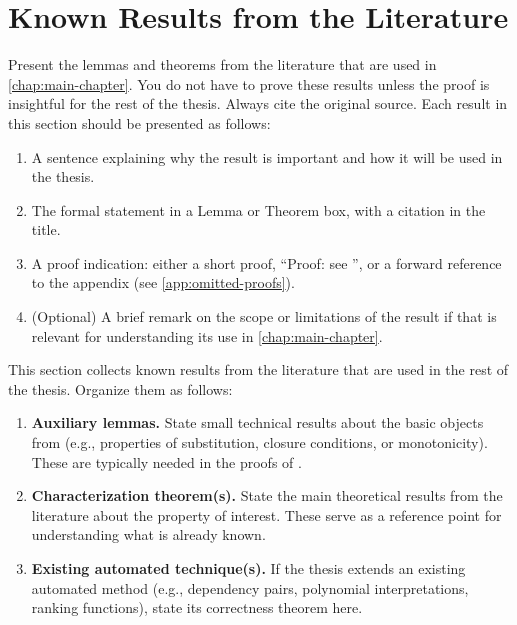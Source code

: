 \section{Known Results from the Literature}\label{sec:known-results}

Present the lemmas and theorems from the literature that are used in
\cref{chap:main-chapter}. 
You do not have to prove these results unless the proof is insightful for the 
rest of the thesis. 
Always cite the original source.
%
Each result in this section should be presented as follows:
\begin{enumerate}
    \item A sentence explaining why the result is important and how it will
     be used in the thesis.
     \item The formal statement in a Lemma or Theorem box, with a citation in
     the title.
     \item A proof indication: either a short proof, ``Proof: see 
     \cite{replace-with-citation}'', or a forward reference to the appendix
     (see \cref{app:omitted-proofs}).
     \item (Optional) A brief remark on the scope or limitations of the result
     if that is relevant for understanding its use in \cref{chap:main-chapter}.
\end{enumerate}

This section collects known results from the literature that are used in the
rest of the thesis.
Organize them as follows:
\begin{enumerate}
    \item \textbf{Auxiliary lemmas.} State small technical results about the
          basic objects from  (e.g., properties
          of substitution, closure conditions, or monotonicity).
          These are typically needed in the proofs of .

    \item \textbf{Characterization theorem(s).} State the main theoretical
          results from the literature about the property of interest.
          These serve as a reference point for understanding what is already
          known.

    \item \textbf{Existing automated technique(s).} If the thesis extends an
          existing automated method (e.g., dependency pairs, polynomial
          interpretations, ranking functions), state its correctness theorem
          here.
\end{enumerate}

